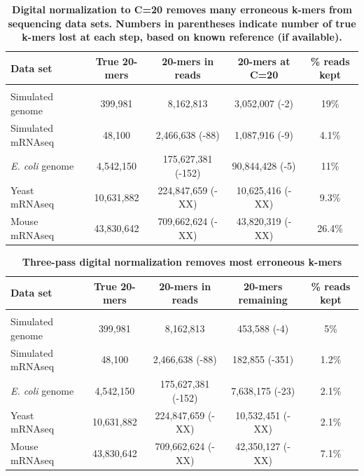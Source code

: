 \documentclass[10pt]{article}
\begin{document}
\begin{table}[!ht]
\caption{
\bf{Digital normalization to C=20 removes many erroneous k-mers from sequencing data sets.  Numbers
in parentheses indicate number of true k-mers lost at each step, based on known reference (if available).}}
\begin{tabular}{|l|c|c|c|c|}
Data set & True 20-mers & 20-mers in reads & 20-mers at C=20 & \% reads kept\\
\hline \\
Simulated genome & 399,981 & 8,162,813 & 3,052,007 (-2) & 19\% \\
Simulated mRNAseq & 48,100 & 2,466,638 (-88) & 1,087,916 (-9) & 4.1\% \\
{\em E. coli} genome & 4,542,150 & 175,627,381 (-152) & 90,844,428 (-5) & 11\% \\
Yeast mRNAseq & 10,631,882 & 224,847,659 (-XX) & 10,625,416 (-XX) & 9.3\% \\
Mouse mRNAseq & 43,830,642 & 709,662,624 (-XX) & 43,820,319 (-XX) & 26.4\% \\
\end{tabular}
\begin{flushleft}
\end{flushleft}
\label{tab:normC20}
\end{table}



\begin{table}[!ht]
\caption{
\bf{Three-pass digital normalization removes most erroneous k-mers}}
\begin{tabular}{|l|c|c|c|c|}
Data set & True 20-mers & 20-mers in reads & 20-mers remaining & \% reads kept\\
\hline \\
Simulated genome & 399,981 & 8,162,813 & 453,588 (-4) & 5\% \\
Simulated mRNAseq & 48,100 & 2,466,638 (-88) & 182,855 (-351) & 1.2\% \\
{\em E. coli} genome & 4,542,150 & 175,627,381 (-152) & 7,638,175 (-23) & 2.1\% \\
Yeast mRNAseq & 10,631,882 & 224,847,659 (-XX) & 10,532,451 (-XX) & 2.1\% \\
Mouse mRNAseq & 43,830,642 & 709,662,624 (-XX) & 42,350,127 (-XX) & 7.1\% \\
\end{tabular}
\begin{flushleft}
\end{flushleft}
\label{tab:normC5}
\end{table}
\end{document}
